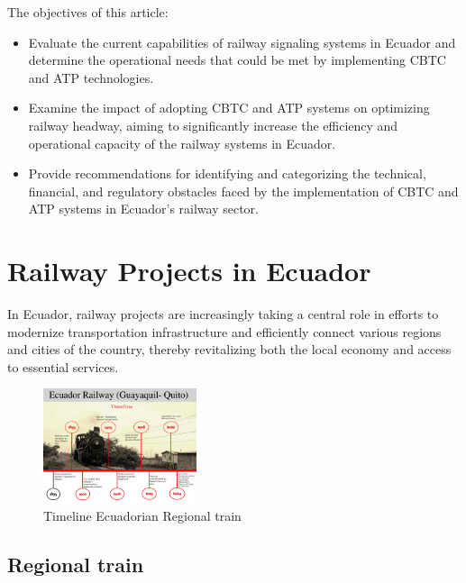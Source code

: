 \documentclass[conference]{IEEEtran}
\begin{document}
The objectives of this article:
\begin{itemize}
\item  Evaluate the current capabilities of railway signaling systems in Ecuador and determine the operational needs that could be met by implementing CBTC and ATP technologies.
\item Examine the impact of adopting CBTC and ATP systems on optimizing railway headway, aiming to significantly increase the efficiency and operational capacity of the railway systems in Ecuador.
\item Provide recommendations for identifying and categorizing the technical, financial, and regulatory obstacles faced by the implementation of CBTC and ATP systems in Ecuador's railway sector.
\end{itemize}


\section{Railway Projects in Ecuador}

In Ecuador, railway projects are increasingly taking a central role in efforts to modernize transportation infrastructure and efficiently connect various regions and cities of the country, thereby revitalizing both the local economy and access to essential services.
\begin{figure}[ht]
    \centering
    \includegraphics[width=0.4\textwidth]{Imagenes_general/Timeline railway Guayaquil - Quito_1.pdf}
    \caption{Timeline Ecuadorian Regional train}
    \label{fig:timeline_train_reg}
\end{figure}

\subsection{Regional train}
\end{document}
